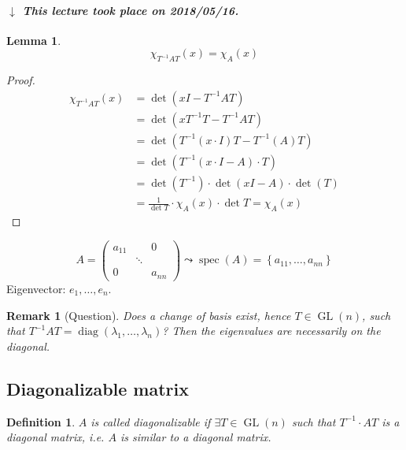 \documentclass[a4paper]{article}
\newcounter{lecref}[section]
\numberwithin{lecref}{section}
\newtheorem{definition}[lecref]{Definition}
\newtheorem{lemma}[lecref]{Lemma}
\newtheorem*{Remark}{Remark}
\newcommand{\set}[1]{\left\{#1\right\}}
\newcommand{\card}[1]{\left|#1\right|}
\newcommand{\dateref}[1]{%
  \begin{mdframed}[backgroundcolor=gray!10,innerbottommargin=0pt,innertopmargin=0pt]
    \paragraph{\textit{$\downarrow$ This lecture took place on #1.}}%
  \end{mdframed}%
}
\begin{document}
\dateref{2018/05/16}


\begin{lemma} %
  \[ \chi_{T^{-1} AT}(x) = \chi_A(x) \]
\end{lemma}
\begin{proof}
  \begin{align*}
    \chi_{T^{-1}AT}(x) &= \det(xI - T^{-1}AT) \\
      &= \det(x T^{-1} T - T^{-1} AT) \\
      &= \det(T^{-1} (x \cdot I) T - T^{-1} (A) T) \\
      &= \det(T^{-1}(x \cdot I - A) \cdot T) \\
      &= \det(T^{-1}) \cdot \det(xI - A) \cdot \det(T) \\
      &= \frac{1}{\det{T}} \cdot \chi_A(x) \cdot \det{T} = \chi_A(x)
  \end{align*}
\end{proof}

\[ A = \begin{pmatrix} a_{11} & & 0 \\ & \ddots & \\ 0 & & a_{nn} \end{pmatrix} \leadsto \operatorname{spec}(A) = \set{a_{11}, \dots, a_{nn}} \]
Eigenvector: $e_1, \dots, e_n$.

\begin{Remark}[Question]
  Does a change of basis exist, hence $T \in \operatorname{GL}(n)$, such that $T^{-1} AT = \operatorname{diag}(\lambda_1, \dots, \lambda_n)$?
  Then the eigenvalues are necessarily on the diagonal.
\end{Remark}

\subsection{Diagonalizable matrix}

\begin{definition} %
  $A$ is called \emph{diagonalizable} if $\exists T \in \operatorname{GL}(n)$ such that $T^{-1} \cdot AT$ is a diagonal matrix,
  i.e. $A$ is \emph{similar} to a diagonal matrix.
\end{definition}
\end{document}
